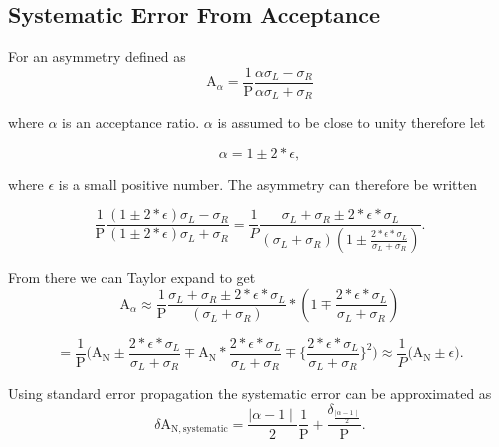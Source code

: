 \chapter{}
\ifpdf
\graphicspath{{Chapters/Appendix/Figs/Raster/}{Chapters/Appendix/Figs/PDF/}{Chapters/Appendix/Figs/}}
\else \graphicspath{{Chapters/Appendix/Figs/Vector/}{Chapters/Appendix/Figs/}}
\fi

\section{Systematic Error From Acceptance} \label{app::sysAcc}

For an asymmetry defined as
\begin{equation}
  \mathrm{A}_{\alpha} =
  \frac{1}{\mathrm{P}}
  \frac{\alpha\sigma_L - \sigma_R}{\alpha\sigma_L + \sigma_R} 
\end{equation}

\noindent
where $\alpha$ is an acceptance ratio.  $\alpha$ is assumed to be close to unity
therefore let

\begin{equation}
  \alpha = 1 \pm 2*\epsilon,
\end{equation}

\noindent
where $\epsilon$ is a small positive number.  The asymmetry can
therefore be written

\begin{equation}
  \frac{1}{\mathrm{P}}
  \frac{(1\pm2*\epsilon)\sigma_L -
    \sigma_R}{(1\pm2*\epsilon)\sigma_L + \sigma_R} = \frac{1}{P} \frac{\sigma_L
    + \sigma_R \pm 2*\epsilon * \sigma_L}{ (\sigma_L +
    \sigma_R)(1\pm\frac{2*\epsilon *\sigma_L}{\sigma_L + \sigma_R}) }.
\end{equation}

\noindent
From there we can Taylor expand to get
\begin{equation}
  \mathrm{A}_{\alpha} \approx \frac{1}{\mathrm{P}} \frac{\sigma_L + \sigma_R \pm
    2*\epsilon * \sigma_L}{ (\sigma_L + \sigma_R)} *(1\mp\frac{2*\epsilon
    *\sigma_L}{\sigma_L + \sigma_R})
\end{equation}

\begin{equation*}
  = \frac{1}{\mathrm{P}}
  \Big (
  \mathrm{A}_{\mathrm{N}}
  \pm \frac{2*\epsilon *\sigma_L}{\sigma_L + \sigma_R}
  \mp \mathrm{A}_{\mathrm{N}}* \frac{2*\epsilon *\sigma_L}{\sigma_L + \sigma_R}
  \mp \Big \{\frac{2*\epsilon *\sigma_L}{\sigma_L + \sigma_R} \Big \}^2
  \Big )
  \approx \frac{1}{P}
  \Big (
  \mathrm{A}_{\mathrm{N}} \pm \epsilon
  \Big ).
\end{equation*}

\noindent
Using standard error propagation the systematic error can be approximated as
\begin{equation}
  \delta \mathrm{A}_{\mathrm{N,systematic}} = \frac{ \mid\alpha - 1
    \mid}{2}\frac{1}{\mathrm{P}} + \frac{\delta_{\frac{\mid \alpha -1
        \mid}{2}}}{\mathrm{P}}.
\end{equation}

